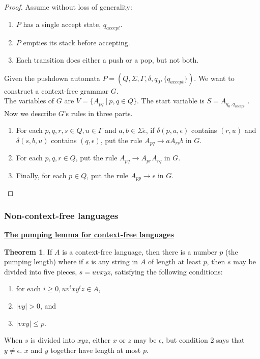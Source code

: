 \documentclass[11pt]{article}
\theoremstyle{definition}
\newtheorem{thm}{Theorem}[section]
\begin{document}
\begin{proof}
    Assume without loss of generality:
    \begin{enumerate}
        \item  $P$ has a single accept state, $q_{accept}$.
        \item $P$ empties its stack before accepting.
        \item Each transition does either a push or a pop, but not both.
    \end{enumerate}
    Given the pushdown automata $P = (Q, \Sigma, \Gamma, \delta, q_0, \{q_{accept}\})$. We want to construct a context-free grammar $G$. \\
    The variables of $G$ are $V = \{A_{pq}\ |\ p, q \in Q\}$. The start variable is $S = A_{q_0 ,q_{accept}}$ . Now we describe $G$'s rules in three parts.
    \begin{enumerate}
        \item For each $p, q, r, s\in Q, u\in \Gamma$ and $a,b\in \Sigma\epsilon$, if $\delta(p,a,\epsilon)$ contains $(r,u)$ and $\delta(s,b,u)$ contains $(q,\epsilon)$, put the rule $A_{pq}\to aA_{rs}b$ in $G$.
        \item For each $p, q, r\in Q$, put the rule $A_{pq}\to A_{pr}A_{rq}$ in $G$.
        \item Finally, for each $p \in Q$, put the rule $A_{pp}\to\epsilon$ in $G$.
    \end{enumerate}
\end{proof}

\subsubsection{Non-context-free languages}
\textbf{\underline{The pumping lemma for context-free languages}}
\begin{thm}
    If $A$ is a context-free language, then there is a number $p$ (the pumping length) where if $s$ is any string in $A$ of length at least $p$, then $s$ may be divided into five pieces, $s = uvxyz$, satisfying the following conditions:
    \begin{enumerate}
        \item for each $i\geq 0, uv^ixy^iz\in A$,
        \item $|vy|>0$, and
        \item $|vxy| \leq p$.
    \end{enumerate}
When $s$ is divided into $xyz$, either $x$ or $z$ may be $\epsilon$, but condition 2 says that $y \neq \epsilon$. $x$ and $y$ together have length at most $p$.
\end{thm}
\pagebreak
\end{document}
